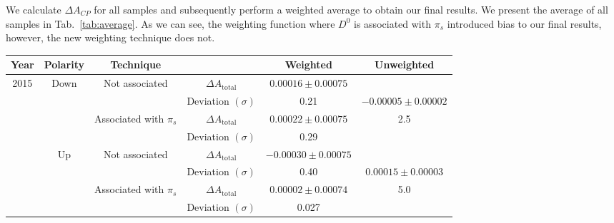 \documentclass{article}
\begin{document}
        We calculate $\Delta A_{CP}$ for all samples and subsequently perform a weighted average to obtain our final results.
        We present the average of all samples in Tab.~\ref{tab:average}.
        As we can see, the weighting function where $D^0$ is associated with $\pi_s$ introduced bias to our final results, however, the new weighting technique does not.

        \begin{center}
                \begin{tabular}{c|c|c|c|c|c}
                        Year & Polarity & Technique & & Weighted & Unweighted\\
                        \hline\hline
                        \multirow{8}{*}{2015} & \multirow{4}{*}{Down} & \multirow{2}{*}{Not associated} & $\Delta A_\text{total}$ & $0.00016 \pm 0.00075$ & \\
                        & & & Deviation $(\sigma)$ & 0.21 & $-0.00005 \pm 0.00002$\\
                        \cline{3-5}
                        & & \multirow{2}{*}{Associated with $\pi_s$} & $\Delta A_\text{total}$ & $0.00022 \pm 0.00075$ & 2.5 \\
                        & & & Deviation $(\sigma)$ & 0.29 & \\
                        \cline{2-6}
                        & \multirow{4}{*}{Up} & \multirow{2}{*}{Not associated} & $\Delta A_\text{total}$ & $-0.00030 \pm 0.00075$ & \\
                        & & & Deviation $(\sigma)$ & 0.40 & $0.00015 \pm 0.00003$ \\
                        \cline{3-5}
                        & & \multirow{2}{*}{Associated with $\pi_s$} & $\Delta A_\text{total}$ & $0.00002 \pm 0.00074$ & 5.0 \\
                        & & & Deviation $(\sigma)$ & 0.027 & \\
                        \hline


\end{tabular}
\end{center}
\end{document}
